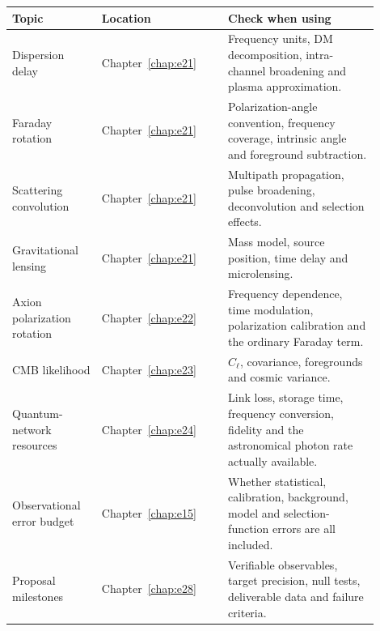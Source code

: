 \begin{longtable}{p{0.22\linewidth}p{0.31\linewidth}p{0.37\linewidth}}
\toprule
Topic & Location & Check when using \\
\midrule
Dispersion delay & Chapter~\ref{chap:e21} & Frequency units, DM decomposition, intra-channel broadening and plasma approximation. \\
Faraday rotation & Chapter~\ref{chap:e21} & Polarization-angle convention, frequency coverage, intrinsic angle and foreground subtraction. \\
Scattering convolution & Chapter~\ref{chap:e21} & Multipath propagation, pulse broadening, deconvolution and selection effects. \\
Gravitational lensing & Chapter~\ref{chap:e21} & Mass model, source position, time delay and microlensing. \\
Axion polarization rotation & Chapter~\ref{chap:e22} & Frequency dependence, time modulation, polarization calibration and the ordinary Faraday term. \\
CMB likelihood & Chapter~\ref{chap:e23} & \(C_\ell\), covariance, foregrounds and cosmic variance. \\
Quantum-network resources & Chapter~\ref{chap:e24} & Link loss, storage time, frequency conversion, fidelity and the astronomical photon rate actually available. \\
Observational error budget & Chapter~\ref{chap:e15} & Whether statistical, calibration, background, model and selection-function errors are all included. \\
Proposal milestones & Chapter~\ref{chap:e28} & Verifiable observables, target precision, null tests, deliverable data and failure criteria. \\
\bottomrule
\end{longtable}
